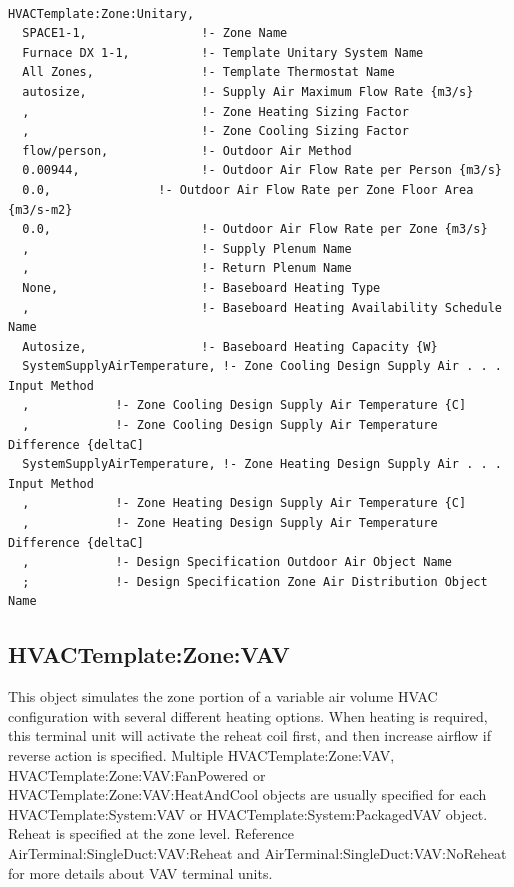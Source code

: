\begin{lstlisting}

HVACTemplate:Zone:Unitary,
  SPACE1-1,                !- Zone Name
  Furnace DX 1-1,          !- Template Unitary System Name
  All Zones,               !- Template Thermostat Name
  autosize,                !- Supply Air Maximum Flow Rate {m3/s}
  ,                        !- Zone Heating Sizing Factor
  ,                        !- Zone Cooling Sizing Factor
  flow/person,             !- Outdoor Air Method
  0.00944,                 !- Outdoor Air Flow Rate per Person {m3/s}
  0.0,               !- Outdoor Air Flow Rate per Zone Floor Area {m3/s-m2}
  0.0,                     !- Outdoor Air Flow Rate per Zone {m3/s}
  ,                        !- Supply Plenum Name
  ,                        !- Return Plenum Name
  None,                    !- Baseboard Heating Type
  ,                        !- Baseboard Heating Availability Schedule Name
  Autosize,                !- Baseboard Heating Capacity {W}
  SystemSupplyAirTemperature, !- Zone Cooling Design Supply Air . . . Input Method
  ,            !- Zone Cooling Design Supply Air Temperature {C]
  ,            !- Zone Cooling Design Supply Air Temperature Difference {deltaC]
  SystemSupplyAirTemperature, !- Zone Heating Design Supply Air . . . Input Method
  ,            !- Zone Heating Design Supply Air Temperature {C]
  ,            !- Zone Heating Design Supply Air Temperature Difference {deltaC]
  ,            !- Design Specification Outdoor Air Object Name
  ;            !- Design Specification Zone Air Distribution Object Name
\end{lstlisting}

\subsection{HVACTemplate:Zone:VAV}\label{hvactemplatezonevav}

This object simulates the zone portion of a variable air volume HVAC configuration with several different heating options. When heating is required, this terminal unit will activate the reheat coil first, and then increase airflow if reverse action is specified. Multiple HVACTemplate:Zone:VAV, HVACTemplate:Zone:VAV:FanPowered or HVACTemplate:Zone:VAV:HeatAndCool objects are usually specified for each HVACTemplate:System:VAV or HVACTemplate:System:PackagedVAV object. Reheat is specified at the zone level. Reference AirTerminal:SingleDuct:VAV:Reheat and AirTerminal:SingleDuct:VAV:NoReheat for more details about VAV terminal units.

